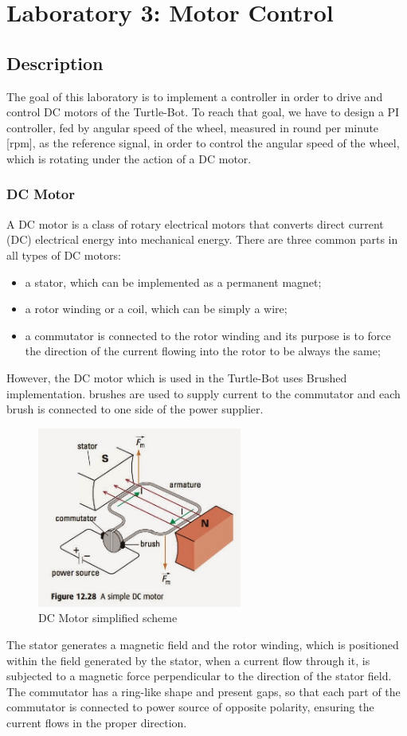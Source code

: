 \documentclass[english]{article}
\begin{document}
\newpage
\section{Laboratory 3: Motor Control}
\subsection{Description}
The goal of this laboratory is to implement a controller in order to drive and 
control DC motors of the Turtle-Bot. To reach that goal, we have to design a PI 
controller, fed by angular speed of the wheel, measured in round per minute [rpm],
as the reference signal, in order to control the angular speed of the wheel, which
is rotating under the action of a DC motor.  
\subsubsection{DC Motor}
A DC motor is a class of rotary electrical motors that converts direct current (DC)
electrical energy into mechanical energy. There are three common parts in all types
of DC motors: 
\begin{itemize}
    \item a stator, which can be implemented as a permanent magnet; 
    \item a rotor winding or a coil, which can be simply a wire; 
    \item a commutator is connected to the rotor winding and its purpose is to force 
    the direction of the current flowing into the rotor to be always the same; 
\end{itemize}
However, the DC motor which is used in the Turtle-Bot uses Brushed implementation.
brushes are used to supply current to the commutator and each brush is connected to
one side of the power supplier. 
\newpage
\begin{figure}[!h]
    \centering
    \includegraphics[width=0.60\textwidth, height=0.30\textheight]{figures/motorfig.png}
    \caption{DC Motor simplified scheme }
    \label{fig:motorfig}
\end{figure}
The stator generates a magnetic field and the rotor winding, which is positioned within
 the field generated by the stator, when a current flow through it, is subjected to a 
 magnetic force perpendicular to the direction of the stator field. The commutator has
  a ring-like shape and present gaps, so that each part of the commutator is connected
to power source of opposite polarity, ensuring the current flows in the proper
   direction. 
\end{document}
